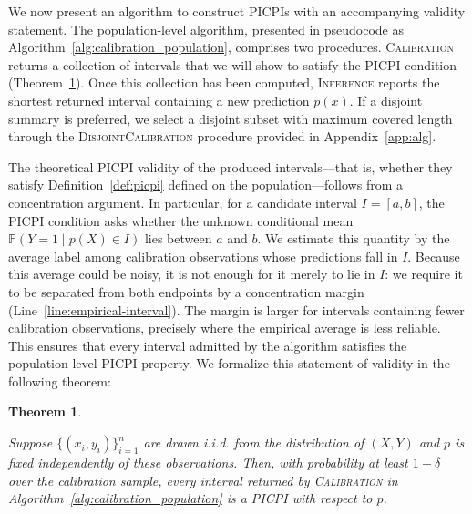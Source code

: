 \documentclass[11pt]{article}
\theoremstyle{statplain}
\newtheorem{theorem}{Theorem}[section]
\theoremstyle{statdefinition}
\newcommand{\PP}{\mathbb{P}}
\newcommand{\0}{\mathbf{0}}
\newcommand{\numData}{n} %
\newcommand{\failureProb}{\delta} %
\newcommand{\discreteNum}{K} %
\newcommand{\titleShort}{PICPI\xspace}
\newcommand{\titleShorts}{PICPIs\xspace}
\begin{document}
We now present an algorithm to construct \titleShorts with an accompanying validity statement. 
The population-level algorithm, presented in pseudocode as Algorithm~\ref{alg:calibration_population}, comprises two procedures.  \textsc{Calibration} returns
a collection of intervals that we will show to satisfy the \titleShort condition (Theorem~\ref{thm:algorithm_population}).  Once this collection has been computed,
\textsc{Inference} reports the shortest returned interval containing a new
prediction $p(x)$. If a disjoint summary is preferred, we select a disjoint subset with maximum covered length through the \textsc{DisjointCalibration} procedure provided in Appendix~\ref{app:alg}.

 

The theoretical \titleShort validity of the produced intervals---that is, whether they satisfy Definition~\ref{def:picpi} defined on the population---follows from a concentration argument. In particular, for a candidate
interval $I=[a,b]$, the \titleShort condition asks whether the unknown
conditional mean
\(
\PP(Y=1\mid p(X)\in I)
\)
lies between $a$ and $b$.  We estimate this quantity by the average label
among calibration observations whose predictions fall in $I$. Because this
average could be noisy, it is not enough for it merely to lie in $I$: we require it
to be separated from both endpoints by a concentration margin (Line~\ref{line:empirical-interval}).  The margin is
larger for intervals containing fewer calibration observations, precisely
where the empirical average is less reliable.
This ensures that every interval admitted by the algorithm satisfies the population-level \titleShort property.
We formalize this statement of validity in the following theorem:
\begin{theorem}\label{thm:algorithm_population}

Suppose $\{(x_i,y_i)\}_{i=1}^{\numData}$ are drawn i.i.d. from the
distribution of $(X,Y)$ and $p$ is fixed independently of these observations.
Then, with probability at least $1-\failureProb$ over the calibration sample,
every interval returned by \textsc{Calibration} in
Algorithm~\ref{alg:calibration_population} is a \titleShort with respect to
$p$.

\end{theorem}
\end{document}
